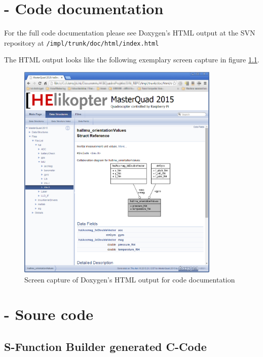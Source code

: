 \chapter{- Code documentation}
\label{sec:b-codeDoc}

For the full code documentation please see Doxygen's HTML output at the SVN repository at
\texttt{/impl/trunk/doc/html/index.html}

The HTML output looks like the following exemplary screen capture in figure \ref{fig:b-codeDoc:doxygenBrowser}.

\begin{figure}[h]
    \centering
    \includegraphics[width=0.86\textwidth]{fig/ch-zz-appendix/B-code-documentation/doxygenHtmlScreen}
    \caption{Screen capture of Doxygen's HTML output for code documentation}
    \label{fig:b-codeDoc:doxygenBrowser}
\end{figure}

\chapter{- Soure code}
\label{sec:append-sourceCode}

\section{S-Function Builder generated C-Code}
\label{sec:c-sFunc-Code}

